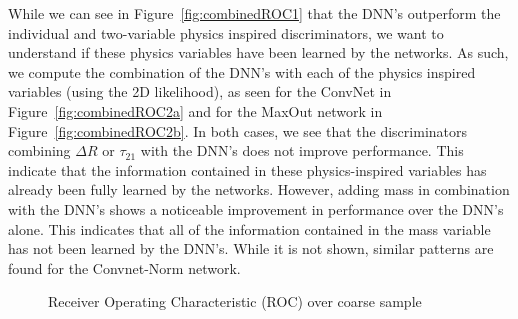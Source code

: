 While we can see in Figure~\ref{fig:combinedROC1} that the DNN's outperform the individual and two-variable physics inspired discriminators, we want to understand if these physics variables have been learned by the networks.  As such, we compute the combination of the DNN's with each of the physics inspired variables (using the 2D likelihood), as seen for the ConvNet in Figure~\ref{fig:combinedROC2a} and for the MaxOut network in Figure~\ref{fig:combinedROC2b}. In both cases, we see that the discriminators combining $\Delta R$ or $\tau_{21}$ with the DNN's does not improve performance.  This indicate that the information contained in these physics-inspired variables  has already been fully learned by the networks.  However, adding mass in combination with the DNN's shows a noticeable improvement in performance over the DNN's alone.  This indicates that all of the information contained in the mass variable has not been learned by the DNN's.  While it is not shown, similar patterns are found for the Convnet-Norm network.
\begin{figure}[!htbp]
  \begin{center}
\end{center}
  \caption{Receiver Operating Characteristic (ROC) over coarse sample}
  \label{fig:combinedROC2}
\end{figure}

